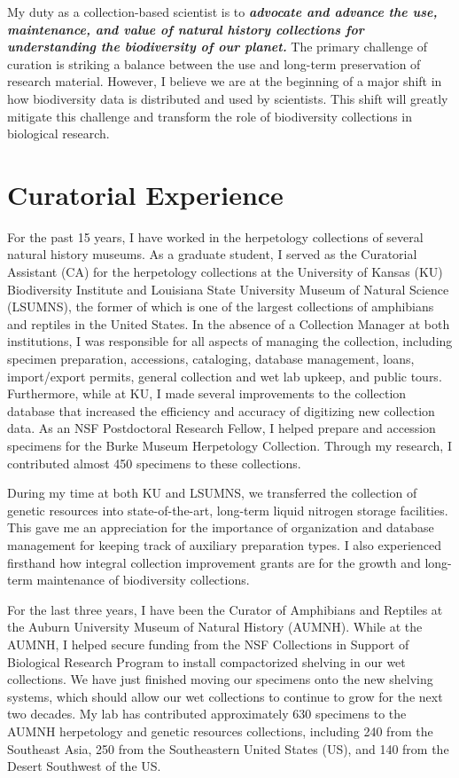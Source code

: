 \documentclass[10pt]{article}
\begin{document}
\raggedright
\singlespacing

My duty as a collection-based scientist is to \textbf{\textit{advocate and
advance the use, maintenance, and value of natural history collections for
understanding the biodiversity of our planet.}}
The primary challenge of curation is striking a balance between the use and
long-term preservation of research material.
However, I believe we are at the beginning of a major shift in how
biodiversity data is distributed and used by scientists.
This shift will greatly mitigate this challenge and transform the role of
biodiversity collections
in biological research.

\section*{Curatorial Experience}
For the past 15 years, I have worked in the herpetology collections
of several natural history museums.
As a graduate student,
I served as the Curatorial Assistant (CA) for the herpetology collections
at the University of Kansas (KU) Biodiversity Institute and Louisiana State
University Museum of Natural Science (LSUMNS), the former of which is one of
the largest collections of amphibians and reptiles in the United States.
In the absence of a Collection Manager at both institutions, I was responsible
for all aspects of managing the collection, including specimen preparation,
accessions, cataloging, database management, loans, import/export permits, 
general collection and wet lab upkeep, and public tours.
Furthermore, while at KU, I made several improvements to the collection
database that increased the efficiency and accuracy of digitizing new
collection data.
As an NSF Postdoctoral Research Fellow, I helped prepare and accession
specimens for the Burke Museum Herpetology Collection.
Through my research, I contributed almost 450 specimens to these collections.

During my time at both KU and LSUMNS, we transferred the collection of genetic
resources into state-of-the-art, long-term liquid nitrogen storage facilities.
This gave me an appreciation for the importance of organization and database
management for keeping track of auxiliary preparation types.
I also experienced firsthand how integral collection improvement grants are
for the growth and long-term maintenance of biodiversity collections.

For the last three years, I have been the Curator of Amphibians and Reptiles at
the Auburn University Museum of Natural History (AUMNH).
While at the AUMNH,
I helped secure funding from the NSF Collections in Support of Biological
Research Program to install compactorized shelving in our wet collections.
We have just finished moving our specimens onto the new shelving systems, which
should allow our wet collections to continue to grow for the next two decades.
My lab has contributed approximately 630 specimens to the AUMNH herpetology and
genetic resources collections, including
240 from the Southeast Asia,
250 from the Southeastern United States (US),
and 140 from the Desert Southwest of the US.
\end{document}
